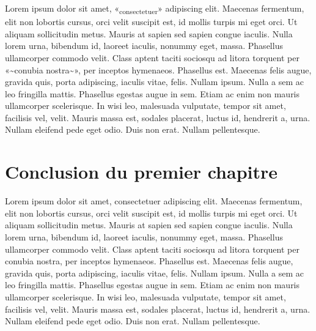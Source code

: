 Lorem ipsum dolor sit amet, «\textsubscript{consectetuer}» adipiscing
elit. Maecenas fermentum, elit non lobortis cursus, orci velit suscipit
est, id mollis turpis mi eget orci. Ut aliquam sollicitudin metus.
Mauris at sapien sed sapien congue iaculis. Nulla lorem urna, bibendum
id, laoreet iaculis, nonummy eget, massa. Phasellus ullamcorper commodo
velit. Class aptent taciti sociosqu ad litora torquent per
«\textasciitilde conubia nostra\textasciitilde», per inceptos hymenaeos.
Phasellus est. Maecenas felis augue, gravida quis, porta adipiscing,
iaculis vitae, felis. Nullam ipsum. Nulla a sem ac leo fringilla mattis.
Phasellus egestas augue in sem. Etiam ac enim non mauris ullamcorper
scelerisque. In wisi leo, malesuada vulputate, tempor sit amet,
facilisis vel, velit. Mauris massa est, sodales placerat, luctus id,
hendrerit a, urna. Nullam eleifend pede eget odio. Duis non erat. Nullam
pellentesque.

\hypertarget{conclusion-du-premier-chapitre}{%
\section{Conclusion du premier
chapitre}\label{conclusion-du-premier-chapitre}}

Lorem ipsum dolor sit amet, consectetuer adipiscing elit. Maecenas
fermentum, elit non lobortis cursus, orci velit suscipit est, id mollis
turpis mi eget orci. Ut aliquam sollicitudin metus. Mauris at sapien sed
sapien congue iaculis. Nulla lorem urna, bibendum id, laoreet iaculis,
nonummy eget, massa. Phasellus ullamcorper commodo velit. Class aptent
taciti sociosqu ad litora torquent per conubia nostra, per inceptos
hymenaeos. Phasellus est. Maecenas felis augue, gravida quis, porta
adipiscing, iaculis vitae, felis. Nullam ipsum. Nulla a sem ac leo
fringilla mattis. Phasellus egestas augue in sem. Etiam ac enim non
mauris ullamcorper scelerisque. In wisi leo, malesuada vulputate, tempor
sit amet, facilisis vel, velit. Mauris massa est, sodales placerat,
luctus id, hendrerit a, urna. Nullam eleifend pede eget odio. Duis non
erat. Nullam pellentesque.
